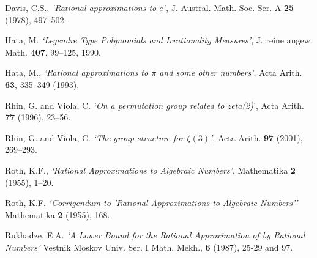 \documentclass[12pt]{article}
\begin{document}
\begin{thebibliography}{9}

Davis, C.S., \textit{`Rational approximations to $e$'},
J. Austral. Math. Soc. Ser. A \textbf{25} (1978), 497--502.

Hata, M. \textit{`Legendre Type Polynomials and Irrationality Measures'}, J. reine angew. Math. \textbf{407}, 99--125, 1990.

Hata, M.,
\textit{`Rational approximations to $\pi$ and some other numbers'},
Acta Arith. \textbf{63}, 335--349 (1993).

Rhin, G. and Viola, C. {\em `On a permutation group related to  
zeta(2)}', 
Acta Arith. {\bf 77} (1996),
23--56.

Rhin, G. and Viola, C. \textit{`The group structure for $\zeta(3)$'}, 
Acta Arith. {\bf 97} (2001), 269--293.

Roth, K.F., \textit{`Rational Approximations to Algebraic Numbers'},
Mathematika {\bf 2} (1955), 1--20. 

Roth, K.F. \textit{`Corrigendum to 
'Rational Approximations to Algebraic Numbers''}
Mathematika {\bf 2} (1955), 168. 

Rukhadze, E.A. \textit{`A Lower Bound for the Rational Approximation of  by Rational Numbers'} Vestnik Moskov Univ. Ser. I Math. Mekh., \textbf{6} (1987), 25-29 and 97. 


\end{thebibliography}
\end{document}
